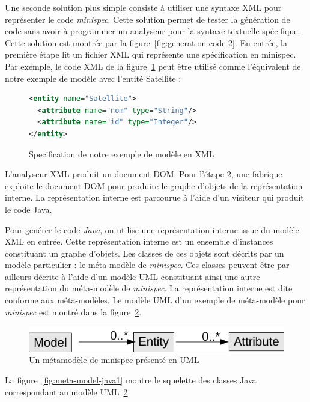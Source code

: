 \documentclass[12pt]{article}
\begin{document}
Une seconde solution plus simple consiste à utiliser une syntaxe XML pour représenter le code \textit{minispec}. Cette solution permet de tester la génération de code sans avoir à programmer un analyseur pour la syntaxe textuelle spécifique. Cette solution est montrée par la figure~\ref{fig:generation-code-2}. En entrée, la première étape lit un fichier XML qui représente une spécification en minispec. Par exemple, le code XML de la figure~\ref{fig:exemple-minispec-XML1} peut être utilisé comme l'équivalent de notre exemple de modèle avec l'entité Satellite :
\begin{figure}
\begin{lstlisting}[language=XML]
<entity name="Satellite">
  <attribute name="nom" type="String"/>
  <attribute name="id" type="Integer"/>
</entity>
\end{lstlisting}
\caption{Specification de notre exemple de modèle en XML}
\label{fig:exemple-minispec-XML1}
\end{figure} 

L'analyseur XML produit un document DOM. Pour l'étape 2, une fabrique exploite le document DOM pour produire le graphe d'objets de la représentation interne. La représentation interne est parcourue à l'aide d'un visiteur qui produit le code Java.

Pour générer le code \textit{Java}, on utilise une représentation interne issue du modèle XML en entrée. Cette représentation interne est un ensemble d'instances constituant un graphe d'objets. Les classes de ces objets sont décrits par un modèle particulier : le méta-modèle de \textit{minispec}. Ces classes peuvent être par ailleurs décrite à l'aide d'un modèle UML constituant ainsi une autre représentation du méta-modèle de \textit{minispec}. La représentation interne est dite conforme aux méta-modèles. Le modèle UML d'un exemple de méta-modèle pour \textit{minispec} est montré dans la figure~\ref{fig:meta-modele-UML1}. 
\begin{figure}
\begin{center}
\includegraphics[scale=0.5]{modeleUML1.png}
\end{center}
\caption{Un métamodèle de minispec présenté en UML}
\label{fig:meta-modele-UML1}
\end{figure} 

La figure~\ref{fig:meta-model-java1} montre le squelette des classes Java correspondant au modèle UML~\ref{fig:meta-modele-UML1}.
\end{document}
